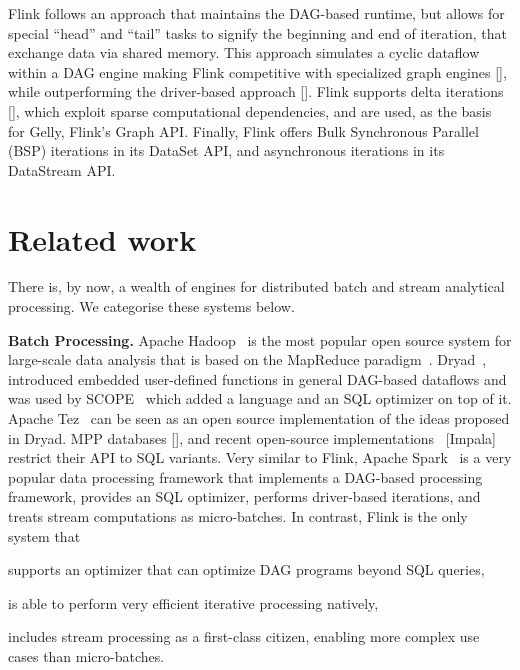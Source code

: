 \documentclass[11pt]{article}
\begin{document}
Flink follows an approach that maintains the DAG-based runtime, but allows for special ``head'' and ``tail'' tasks to signify the beginning and end of iteration, that exchange data via shared memory. This approach simulates a cyclic dataflow within a DAG engine making Flink competitive with specialized graph engines [], while outperforming the driver-based approach []. Flink supports delta iterations [], which exploit sparse computational dependencies, and are used, as the basis for Gelly, Flink's Graph API. Finally, Flink offers Bulk Synchronous Parallel (BSP) iterations in its DataSet API, and asynchronous iterations in its DataStream API.


\section{Related work}

There is, by now, a wealth of engines for distributed batch and stream analytical processing. We categorise these systems below. 

\textbf{Batch Processing.} Apache Hadoop~\cite{CUSTOM:web/Hadoop} is the most popular open source system for large-scale data analysis that is based on the MapReduce paradigm~\cite{DBLP:journals/cacm/DeanG08}. Dryad~\cite{dryad}, introduced embedded user-defined functions in general DAG-based dataflows and was used by SCOPE~\cite{scopeOptimizer} which added a language and an SQL optimizer on top of it. Apache Tez~\cite{CUSTOM:web/Tez} can be seen as an open source implementation of the ideas proposed in Dryad. MPP databases [], and recent open-source implementations~\cite{CUSTOM:web/Drill} [Impala] restrict their API to SQL variants. Very similar to Flink, Apache Spark~\cite{CUSTOM:web/Spark} is a very popular data processing framework that implements a DAG-based processing framework, provides an SQL optimizer, performs driver-based iterations, and treats stream computations as micro-batches. In contrast, Flink is the only system that
\begin{inparaenum}[i)]
  \item supports an optimizer that can optimize DAG programs beyond SQL queries,
  \item is able to perform very efficient iterative processing natively,
  \item includes stream processing as a first-class citizen, enabling more complex use cases than micro-batches.
\end{inparaenum}
\end{document}
